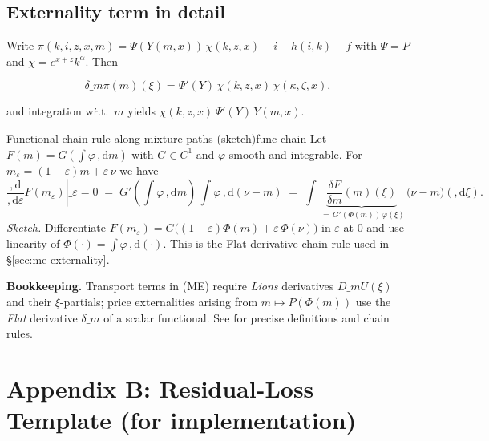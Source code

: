 ﻿\documentclass[11pt,letterpaper,oneside]{article}
\numberwithin{equation}{section}
\newcommand{\1}{\mathbf{1}}
\newcommand{\diff}{,\mathrm{d}}
\newcommand{\Dm}{D\_m}
\begin{document}
\begin{tcolorbox}[didacticstyle]
\begin{itemize}[leftmargin=1.1em,itemsep=0.25em]
\subsection*{Externality term in detail}
Write $\pi(k,i,z,x,m)=\Psi(Y(m,x))\,\chi(k,z,x)-i-h(i,k)-f$ with $\Psi=P$ and $\chi=e^{x+z}k^\alpha$. Then

$$
\delta\_m\pi(m)(\xi)=\Psi'(Y)\,\chi(k,z,x)\,\chi(\kappa,\zeta,x),
$$

and integration w\.r.t.\ $m$ yields $\chi(k,z,x)\,\Psi'(Y)\,Y(m,x)$.


\begin{lemma}{Functional chain rule along mixture paths (sketch)}{func-chain}
Let $F(m)=G\!\left(\int\!\varphi\,\diff m\right)$ with $G\in C^1$ and $\varphi$ smooth and integrable. For $m_\varepsilon=(1-\varepsilon)m+\varepsilon\,\nu$ we have
\[
\left.\frac{\diff}{\diff\varepsilon}F(m_\varepsilon)\right\rvert\_{\varepsilon=0}
\;=\;G'\!\left(\textstyle\int\varphi\,\diff m\right)\,\int\!\varphi\,\diff(\nu-m)
\;=\;\int\!\underbrace{\frac{\delta F}{\delta m}(m)(\xi)}_{\;=\,G'(\Phi(m))\,\varphi(\xi)}\,\big(\nu-m\big)(\diff\xi).
\]
\emph{Sketch.} Differentiate $F(m_\varepsilon)=G\big((1-\varepsilon)\Phi(m)+\varepsilon\,\Phi(\nu)\big)$ in $\varepsilon$ at $0$ and use linearity of $\Phi(\cdot)=\int\varphi\,\diff(\cdot)$. This is the Flat-derivative chain rule used in \S\ref{sec:me-externality}.
\end{lemma}

\begin{tcolorbox}[mathstyle]
\textbf{Bookkeeping.} Transport terms in (ME) require \emph{Lions} derivatives $\Dm U(\xi)$ and their $\xi$-partials; price externalities arising from $m\mapsto P(\Phi(m))$ use the \emph{Flat} derivative $\delta\_m$ of a scalar functional. See  for precise definitions and chain rules.
\end{tcolorbox}

\section{Appendix B: Residual-Loss Template (for implementation)}\label{app:loss}


\end{itemize}
\end{tcolorbox}
\end{document}
